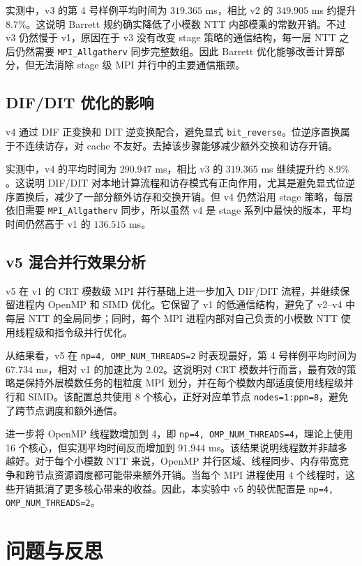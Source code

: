 \documentclass[a4paper]{article}
\begin{document}
实测中，v3 的第 4 号样例平均时间为 $319.365$ ms，相比 v2 的 $349.905$ ms 约提升 $8.7\%$。这说明 Barrett 规约确实降低了小模数 NTT 内部模乘的常数开销。不过 v3 仍然慢于 v1，原因在于 v3 没有改变 stage 策略的通信结构，每一层 NTT 之后仍然需要 \texttt{MPI\_Allgatherv} 同步完整数组。因此 Barrett 优化能够改善计算部分，但无法消除 stage 级 MPI 并行中的主要通信瓶颈。

\subsection{DIF/DIT 优化的影响}

v4 通过 DIF 正变换和 DIT 逆变换配合，避免显式 \texttt{bit\_reverse}。位逆序置换属于不连续访存，对 cache 不友好。去掉该步骤能够减少额外交换和访存开销。

实测中，v4 的平均时间为 $290.947$ ms，相比 v3 的 $319.365$ ms 继续提升约 $8.9\%$。这说明 DIF/DIT 对本地计算流程和访存模式有正向作用，尤其是避免显式位逆序置换后，减少了一部分额外访存和交换开销。但 v4 仍然沿用 stage 策略，每层依旧需要 \texttt{MPI\_Allgatherv} 同步，所以虽然 v4 是 stage 系列中最快的版本，平均时间仍然高于 v1 的 $136.515$ ms。

\subsection{v5 混合并行效果分析}

v5 在 v1 的 CRT 模数级 MPI 并行基础上进一步加入 DIF/DIT 流程，并继续保留进程内 OpenMP 和 SIMD 优化。它保留了 v1 的低通信结构，避免了 v2--v4 中每层 NTT 的全局同步；同时，每个 MPI 进程内部对自己负责的小模数 NTT 使用线程级和指令级并行优化。

从结果看，v5 在 \texttt{np=4, OMP\_NUM\_THREADS=2} 时表现最好，第 4 号样例平均时间为 $67.734$ ms，相对 v1 的加速比为 $2.02$。这说明对 CRT 模数并行而言，最有效的策略是保持外层模数任务的粗粒度 MPI 划分，并在每个模数内部适度使用线程级并行和 SIMD。该配置总共使用 8 个核心，正好对应单节点 \texttt{nodes=1:ppn=8}，避免了跨节点调度和额外通信。

进一步将 OpenMP 线程数增加到 4，即 \texttt{np=4, OMP\_NUM\_THREADS=4}，理论上使用 16 个核心，但实测平均时间反而增加到 $91.944$ ms。该结果说明线程数并非越多越好。对于每个小模数 NTT 来说，OpenMP 并行区域、线程同步、内存带宽竞争和跨节点资源调度都可能带来额外开销。当每个 MPI 进程使用 4 个线程时，这些开销抵消了更多核心带来的收益。因此，本实验中 v5 的较优配置是 \texttt{np=4, OMP\_NUM\_THREADS=2}。

\section{问题与反思}
\end{document}

